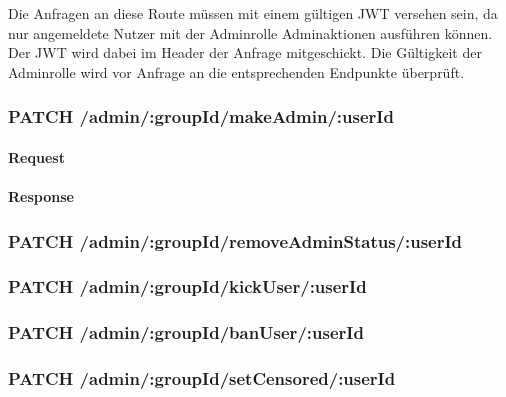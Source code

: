\documentclass{entwurfsheft}
\begin{document}
Die Anfragen an diese Route müssen mit einem gültigen JWT versehen sein, da nur angemeldete Nutzer mit der Adminrolle Adminaktionen ausführen können.
Der JWT wird dabei im Header der Anfrage mitgeschickt.
Die Gültigkeit der Adminrolle wird vor Anfrage an die entsprechenden Endpunkte überprüft.

\subsubsection*{PATCH /admin/:groupId/makeAdmin/:userId}
\paragraph{Request}

\paragraph{Response}

\subsubsection*{PATCH /admin/:groupId/removeAdminStatus/:userId}
\subsubsection*{PATCH /admin/:groupId/kickUser/:userId}
\subsubsection*{PATCH /admin/:groupId/banUser/:userId}
\subsubsection*{PATCH /admin/:groupId/setCensored/:userId}

\newpage
\end{document}

